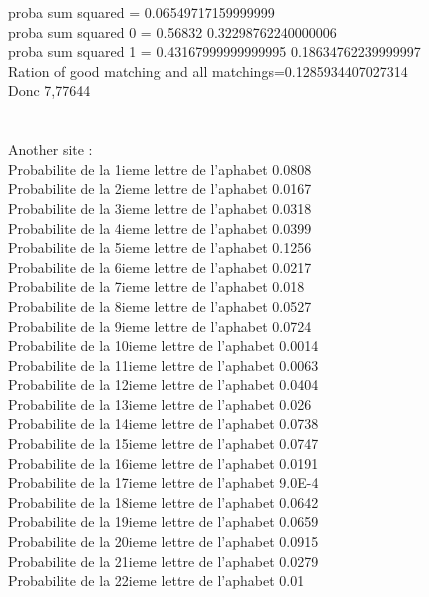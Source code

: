 \documentclass{article}
\begin{document}
proba sum squared = 0.06549717159999999\\
proba sum squared 0 = 0.56832 0.32298762240000006\\
proba sum squared 1 = 0.43167999999999995 0.18634762239999997\\
Ration of good matching and all matchings=0.1285934407027314\\
Donc 7,77644
\\
\\
\\
Another site :\\
Probabilite de la 1ieme lettre de l'aphabet 0.0808\\
Probabilite de la 2ieme lettre de l'aphabet 0.0167\\
Probabilite de la 3ieme lettre de l'aphabet 0.0318\\
Probabilite de la 4ieme lettre de l'aphabet 0.0399\\
Probabilite de la 5ieme lettre de l'aphabet 0.1256\\
Probabilite de la 6ieme lettre de l'aphabet 0.0217\\
Probabilite de la 7ieme lettre de l'aphabet 0.018\\
Probabilite de la 8ieme lettre de l'aphabet 0.0527\\
Probabilite de la 9ieme lettre de l'aphabet 0.0724\\
Probabilite de la 10ieme lettre de l'aphabet 0.0014\\
Probabilite de la 11ieme lettre de l'aphabet 0.0063\\
Probabilite de la 12ieme lettre de l'aphabet 0.0404\\
Probabilite de la 13ieme lettre de l'aphabet 0.026\\
Probabilite de la 14ieme lettre de l'aphabet 0.0738\\
Probabilite de la 15ieme lettre de l'aphabet 0.0747\\
Probabilite de la 16ieme lettre de l'aphabet 0.0191\\
Probabilite de la 17ieme lettre de l'aphabet 9.0E-4\\
Probabilite de la 18ieme lettre de l'aphabet 0.0642\\
Probabilite de la 19ieme lettre de l'aphabet 0.0659\\
Probabilite de la 20ieme lettre de l'aphabet 0.0915\\
Probabilite de la 21ieme lettre de l'aphabet 0.0279\\
Probabilite de la 22ieme lettre de l'aphabet 0.01\\
\end{document}
